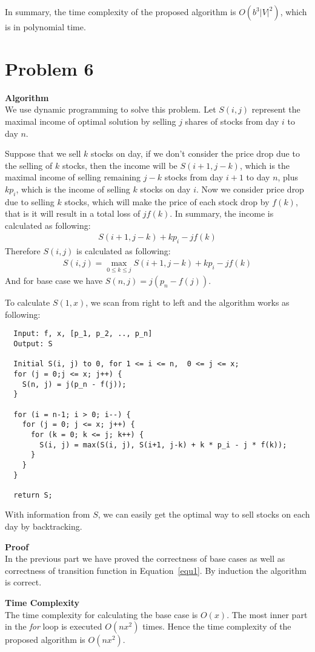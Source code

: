 \documentclass{article}
\newcommand{\Complexity}{\vspace{0.3cm} \noindent\textbf{Time Complexity} \\}
\newcommand{\Proof}{\vspace{0.3cm} \noindent\textbf{Proof} \\}
\newcommand{\Algorithm}{\textbf{Algorithm} \\}
\begin{document}
In summary, the time complexity of the proposed algorithm is $O(b^3 |V|^2)$, which is in polynomial
time.

\section*{Problem 6}
\Algorithm
We use dynamic programming to solve this problem. Let $S(i, j)$ represent the maximal income of
optimal solution by selling $j$ shares of stocks from day $i$ to day $n$.

Suppose that we sell $k$ stocks on day, if we don't consider the price drop due to the selling of
$k$ stocks, then the income will be $ S(i+1, j-k)$, which is the maximal income of selling remaining 
$j-k$ stocks from day $i+1$ to day $n$, plus $k p_i$, which is the income of selling $k$ stocks on
day $i$. Now we consider price drop due to selling $k$ stocks, which will make the price of each
stock drop by $f(k)$, that is it will result in a total loss of $jf(k)$. In summary, the income
is calculated as following:
\begin{align}
  S(i+1, j - k) + k p_i - jf(k) 
\end{align}
Therefore $S(i, j)$ is calculated as following:
\begin{align}\label{equ1}
  S(i, j) = \max_{0 \leq k \leq j} S(i+1, j-k) + k p_i - jf(k)
\end{align}
And for base case we have $S(n, j) = j(p_n - f(j))$. 

To calculate $S(1, x)$, we scan from right to left and the algorithm works as following:
\begin{verbatim}
  Input: f, x, [p_1, p_2, .., p_n]
  Output: S

  Initial S(i, j) to 0, for 1 <= i <= n,  0 <= j <= x;
  for (j = 0;j <= x; j++) {
    S(n, j) = j(p_n - f(j));
  }

  for (i = n-1; i > 0; i--) {
    for (j = 0; j <= x; j++) {
      for (k = 0; k <= j; k++) {
        S(i, j) = max(S(i, j), S(i+1, j-k) + k * p_i - j * f(k));
      }
    }
  }

  return S;
\end{verbatim}

With information from $S$, we can easily get the optimal way to sell stocks on each day by
backtracking.

\Proof
In the previous part we have proved the correctness of base cases as well as correctness of 
transition function in Equation~\ref{equ1}. By induction the algorithm is correct.

\Complexity
The time complexity for calculating the base case is $O(x)$. The most inner part in the \textit{for}
loop is executed $O(nx^2)$ times. Hence the time complexity of the proposed algorithm is $O(nx^2)$.
\end{document}
